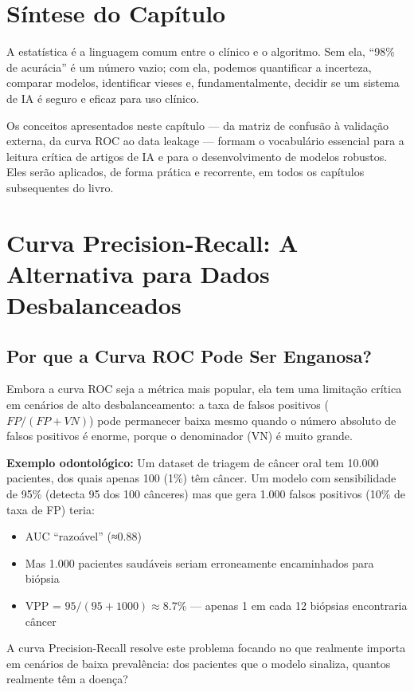 \section{Síntese do Capítulo}

A estatística é a linguagem comum entre o clínico e o algoritmo. Sem ela, ``98\% de acurácia'' é um número vazio; com ela, podemos quantificar a incerteza, comparar modelos, identificar vieses e, fundamentalmente, decidir se um sistema de IA é seguro e eficaz para uso clínico.

Os conceitos apresentados neste capítulo — da matriz de confusão à validação externa, da curva ROC ao data leakage — formam o vocabulário essencial para a leitura crítica de artigos de IA e para o desenvolvimento de modelos robustos. Eles serão aplicados, de forma prática e recorrente, em todos os capítulos subsequentes do livro.

\section{Curva Precision-Recall: A Alternativa para Dados Desbalanceados}

\subsection{Por que a Curva ROC Pode Ser Enganosa?}

Embora a curva ROC seja a métrica mais popular, ela tem uma limitação crítica em cenários de alto desbalanceamento: a taxa de falsos positivos ($FP / (FP + VN)$) pode permanecer baixa mesmo quando o número absoluto de falsos positivos é enorme, porque o denominador (VN) é muito grande.

\textbf{Exemplo odontológico:} Um dataset de triagem de câncer oral tem 10.000 pacientes, dos quais apenas 100 (1\%) têm câncer. Um modelo com sensibilidade de 95\% (detecta 95 dos 100 cânceres) mas que gera 1.000 falsos positivos (10\% de taxa de FP) teria:
\begin{itemize}
    \item AUC ``razoável'' (≈0.88)
    \item Mas 1.000 pacientes saudáveis seriam erroneamente encaminhados para biópsia
    \item VPP = $95 / (95 + 1000) \approx 8.7\%$ — apenas 1 em cada 12 biópsias encontraria câncer
\end{itemize}

A curva Precision-Recall  resolve este problema focando no que realmente importa em cenários de baixa prevalência: dos pacientes que o modelo sinaliza, quantos realmente têm a doença?

